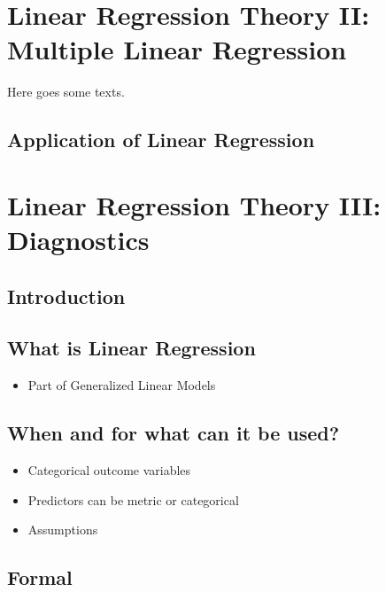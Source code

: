 \documentclass[
]{book}
\providecommand{\tightlist}{%
  \setlength{\itemsep}{0pt}\setlength{\parskip}{0pt}}
\begin{document}
\hypertarget{lin-t-2}{%
\chapter{Linear Regression Theory II: Multiple Linear Regression}\label{lin-t-2}}

Here goes some texts.

\hypertarget{application-of-linear-regression}{%
\section{Application of Linear Regression}\label{application-of-linear-regression}}

\hypertarget{log-t-3}{%
\chapter{Linear Regression Theory III: Diagnostics}\label{log-t-3}}

\hypertarget{introduction-1}{%
\section{Introduction}\label{introduction-1}}

\hypertarget{what-is-linear-regression-1}{%
\section{What is Linear Regression}\label{what-is-linear-regression-1}}

\begin{itemize}
\tightlist
\item
  Part of Generalized Linear Models
\end{itemize}

\hypertarget{when-and-for-what-can-it-be-used}{%
\section{When and for what can it be used?}\label{when-and-for-what-can-it-be-used}}

\begin{itemize}
\item
  Categorical outcome variables
\item
  Predictors can be metric or categorical
\item
  Assumptions
\end{itemize}

\hypertarget{formal}{%
\section{Formal}\label{formal}}
\end{document}
